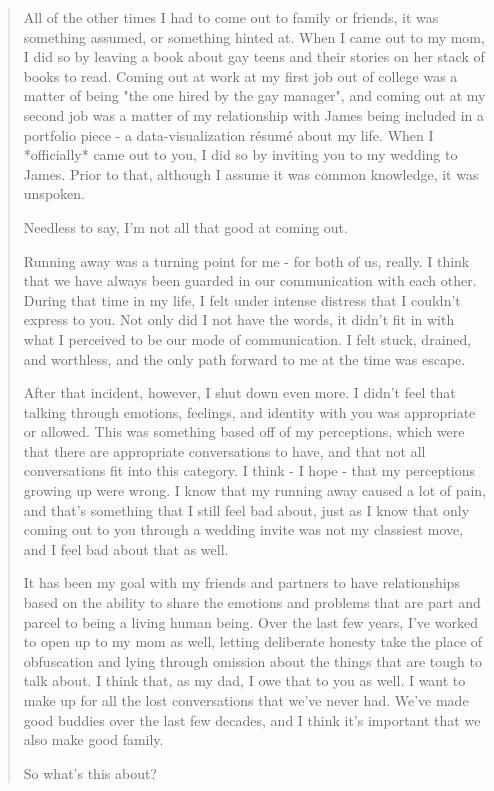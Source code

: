 \begin{paracol}{2}
\begin{leftcolumn}
\begin{quotation}
All of the other times I had to come out to family or friends, it was something assumed, or something hinted at.  When I came out to my mom, I did so by leaving a book about gay teens and their stories on her stack of books to read.  Coming out at work at my first job out of college was a matter of being "the one hired by the gay manager", and coming out at my second job was a matter of my relationship with James being included in a portfolio piece - a data-visualization résumé about my life. When I *officially* came out to you, I did so by inviting you to my wedding to James.  Prior to that, although I assume it was common knowledge, it was unspoken.

Needless to say, I'm not all that good at coming out.

Running away was a turning point for me - for both of us, really.  I think that we have always been guarded in our communication with each other.  During that time in my life, I felt under intense distress that I couldn't express to you.  Not only did I not have the words, it didn't fit in with what I perceived to be our mode of communication.  I felt stuck, drained, and worthless, and the only path forward to me at the time was escape.

After that incident, however, I shut down even more.  I didn't feel that talking through emotions, feelings, and identity with you was appropriate or allowed.  This was something based off of my perceptions, which were that there are appropriate conversations to have, and that not all conversations fit into this category.  I think - I hope - that my perceptions growing up were wrong.  I know that my running away caused a lot of pain, and that's something that I still feel bad about, just as I know that only coming out to you through a wedding invite was not my classiest move, and I feel bad about that as well.

It has been my goal with my friends and partners to have relationships based on the ability to share the emotions and problems that are part and parcel to being a living human being.  Over the last few years, I've worked to open up to my mom as well, letting deliberate honesty take the place of obfuscation and lying through omission about the things that are tough to talk about.  I think that, as my dad, I owe that to you as well.  I want to make up for all the lost conversations that we've never had.  We've made good buddies over the last few decades, and I think it's important that we also make good family.

So what's this about?


\end{quotation}
\end{leftcolumn}
\end{paracol}
